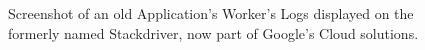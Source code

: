 \begin{figure}[!htbp]
    \centering
    \caption[Screenshot Google Cloud Log Monitoring]{Screenshot of an old Application's Worker's Logs displayed on the formerly named Stackdriver, now part of Google's Cloud solutions.}
    \label{fig:stackdriver-example-01}
\end{figure} 
    